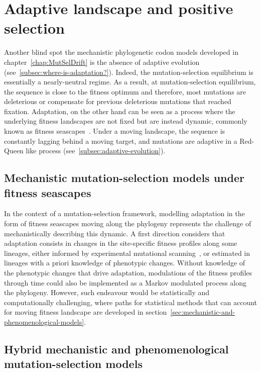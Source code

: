 \section{Adaptive landscape and positive selection}
\label{sec:adaptative-landscape}

Another blind spot the mechanistic phylogenetic codon models developed in chapter~\ref{chap:MutSelDrift} is the absence of adaptive evolution (see~\ref{subsec:where-is-adaptation?}).
Indeed, the mutation-selection equilibrium is essentially a nearly-neutral regime.
As a result, at mutation-selection equilibrium, the sequence is close to the fitness optimum and therefore, most mutations are deleterious or compensate for previous deleterious mutations that reached fixation.
Adaptation, on the other hand can be seen as a process where the underlying fitness landscapes are not fixed but are instead dynamic, commonly known as fitness seascapes~\citep{Mustonen2009}.
Under a moving landscape, the sequence is constantly lagging behind a moving target, and mutations are adaptive in a Red-Queen like process (see~\ref{subsec:adaptive-evolution}).

\subsection{Mechanistic mutation-selection models under fitness seascapes}
\label{subsec:mechanistic-fluctuating-selection}

In the context of a mutation-selection framework, modelling adaptation in the form of fitness seascapes moving along the phylogeny represents the challenge of mechanistically describing this dynamic.
A first direction considers that adaptation consists in changes in the site-specific fitness profiles along some lineages, either informed by experimental mutational scanning~\citep{Bloom2017}, or estimated in lineages with a priori knowledge of phenotypic changes\citep{Tamuri2009, Parto2018, Parto2018a}.
Without knowledge of the phenotypic changes that drive adaptation, modulations of the fitness profiles through time could also be implemented as a Markov modulated process along the phylogeny.
However, such endeavour would be statistically and computationally challenging, where paths for statistical methods that can account for moving fitness landscape are developed in section~\ref{sec:mechanistic-and-phenomenological-models}.

\subsection{Hybrid mechanistic and phenomenological mutation-selection models}
\label{subsec:hybrid-mechanistic-and-phenomenological-mutation-selection-models}

